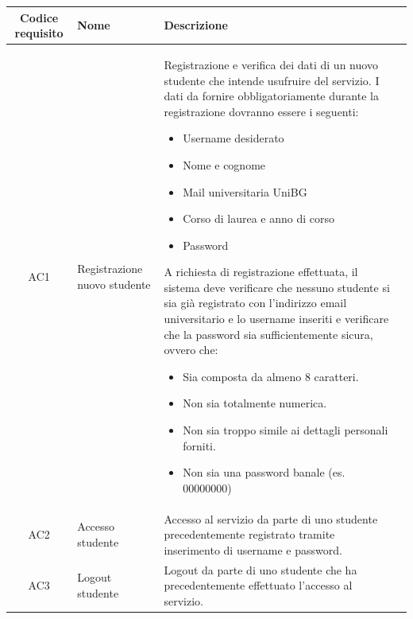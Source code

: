 \documentclass[10pt,a4paper]{article}
\begin{document}
	\begin{tabular}{cp{3cm}p{9cm}p{1cm}}
		Codice requisito&Nome&Descrizione\\ \hline
		AC1&Registrazione nuovo studente&Registrazione e verifica dei dati di un nuovo studente che intende usufruire del servizio. I dati da fornire obbligatoriamente durante la registrazione dovranno essere i seguenti:
		\begin{itemize}
			\item Username desiderato
			\item Nome e cognome
			\item Mail universitaria UniBG
			\item Corso di laurea e anno di corso
			\item Password
		\end{itemize}
		A richiesta di registrazione effettuata, il sistema deve verificare che nessuno studente si sia già registrato con l'indirizzo email universitario e lo username inseriti e verificare che la password sia sufficientemente sicura, ovvero che:
		\begin{itemize}
			\item Sia composta da almeno 8 caratteri.
			\item Non sia totalmente numerica.
			\item Non sia troppo simile ai dettagli personali forniti.
			\item Non sia una password banale (es. 00000000)
		\end{itemize}\\ \hline
		AC2&Accesso studente&Accesso al servizio da parte di uno studente precedentemente registrato tramite inserimento di username e password.\\ \hline
		AC3&Logout studente&Logout da parte di uno studente che ha precedentemente effettuato l'accesso al servizio.\\ \hline
	\end{tabular}
\end{document}

